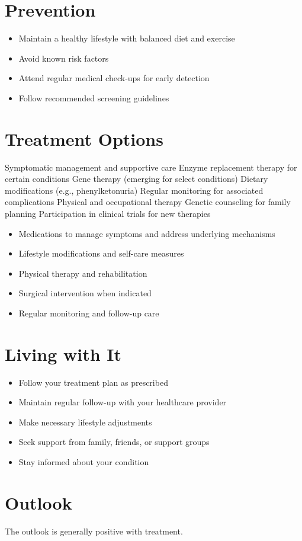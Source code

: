\section{Prevention}
\begin{itemize}[noitemsep]
  \item Maintain a healthy lifestyle with balanced diet and exercise
  \item Avoid known risk factors
  \item Attend regular medical check-ups for early detection
  \item Follow recommended screening guidelines
\end{itemize}
\section{Treatment Options}
Symptomatic management and supportive care Enzyme replacement therapy for certain conditions Gene therapy (emerging for select conditions) Dietary modifications (e.g., phenylketonuria) Regular monitoring for associated complications Physical and occupational therapy Genetic counseling for family planning Participation in clinical trials for new therapies

\begin{itemize}[noitemsep]
  \item Medications to manage symptoms and address underlying mechanisms
  \item Lifestyle modifications and self-care measures
  \item Physical therapy and rehabilitation
  \item Surgical intervention when indicated
  \item Regular monitoring and follow-up care
\end{itemize}
\section{Living with It}
\begin{itemize}[noitemsep]
  \item Follow your treatment plan as prescribed
  \item Maintain regular follow-up with your healthcare provider
  \item Make necessary lifestyle adjustments
  \item Seek support from family, friends, or support groups
  \item Stay informed about your condition
\end{itemize}
\section{Outlook}
The outlook is generally positive with treatment.
